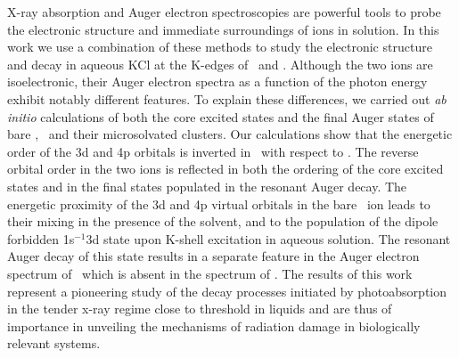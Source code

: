 X-ray absorption and Auger electron spectroscopies are powerful tools to probe the electronic structure and immediate surroundings of ions in solution. In this work we use a combination of these methods to study the electronic structure and decay in aqueous KCl at the K-edges of \ki~and \cli. Although the two ions are isoelectronic, their Auger electron spectra as a function of the photon energy exhibit notably different features. To explain these differences, we carried out {\it ab initio} calculations of both the core excited states and the final Auger states of bare \ki, \cli~and their microsolvated clusters. Our calculations show that the energetic order of the 3d and 4p orbitals is inverted in \ki~with respect to \cli. The reverse orbital order in the two ions is reflected in both the ordering of the core excited states and in the final states populated in the resonant Auger decay. The energetic proximity of the 3d and 4p virtual orbitals in the bare \ki~ion leads to their mixing in the presence of the solvent, and to the population of the dipole forbidden 1s$^{-1}$3d state upon K-shell excitation in aqueous solution. The resonant Auger decay of this state results in a separate feature in the Auger electron spectrum of \ki~which is absent in the spectrum of \cli. The results of this work represent a pioneering study of the decay processes initiated by photoabsorption in the tender x-ray regime close to threshold in liquids and are thus of importance in unveiling the mechanisms of radiation damage in biologically relevant systems.
